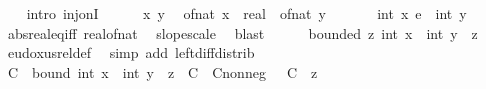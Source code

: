 \begin{isabellebody}
\ \ \isamarkupfalse%
\ {\isacharparenleft}{\kern0pt}intro\ inj{\isacharunderscore}{\kern0pt}onI{\isacharparenright}{\kern0pt}\isanewline
\ \ \ \ \isamarkupfalse%
\ x\ y\ \isamarkupfalse%
\ {\isachardoublequoteopen}{\isacharparenleft}{\kern0pt}of{\isacharunderscore}{\kern0pt}nat\ x\ {\isacharcolon}{\kern0pt}{\isacharcolon}{\kern0pt}\ real{\isacharparenright}{\kern0pt}\ {\isacharequal}{\kern0pt}\ of{\isacharunderscore}{\kern0pt}nat\ y{\isachardoublequoteclose}\isanewline
\ \ \ \ \isamarkupfalse%
\ {\isachardoublequoteopen}{\isacharparenleft}{\kern0pt}{\isacharparenleft}{\kern0pt}{\isacharasterisk}{\kern0pt}{\isacharparenright}{\kern0pt}\ {\isacharparenleft}{\kern0pt}int\ x{\isacharparenright}{\kern0pt}{\isacharparenright}{\kern0pt}\ {\isasymsim}\isactrlsub e\ {\isacharparenleft}{\kern0pt}{\isacharparenleft}{\kern0pt}{\isacharasterisk}{\kern0pt}{\isacharparenright}{\kern0pt}\ {\isacharparenleft}{\kern0pt}int\ y{\isacharparenright}{\kern0pt}{\isacharparenright}{\kern0pt}{\isachardoublequoteclose}\ \isamarkupfalse%
\ abs{\isacharunderscore}{\kern0pt}real{\isacharunderscore}{\kern0pt}eq{\isacharunderscore}{\kern0pt}iff\ real{\isacharunderscore}{\kern0pt}of{\isacharunderscore}{\kern0pt}nat\ \isamarkupfalse%
\ slope{\isacharunderscore}{\kern0pt}scale\ \isamarkupfalse%
\ blast\isanewline
\ \ \ \ \isamarkupfalse%
\ {\isachardoublequoteopen}bounded\ {\isacharparenleft}{\kern0pt}{\isasymlambda}z{\isachardot}{\kern0pt}\ {\isacharparenleft}{\kern0pt}int\ x\ {\isacharminus}{\kern0pt}\ int\ y{\isacharparenright}{\kern0pt}\ {\isacharasterisk}{\kern0pt}\ z{\isacharparenright}{\kern0pt}{\isachardoublequoteclose}\ \isamarkupfalse%
\ eudoxus{\isacharunderscore}{\kern0pt}rel{\isacharunderscore}{\kern0pt}def\ \isamarkupfalse%
\ {\isacharparenleft}{\kern0pt}simp\ add{\isacharcolon}{\kern0pt}\ left{\isacharunderscore}{\kern0pt}diff{\isacharunderscore}{\kern0pt}distrib{\isacharparenright}{\kern0pt}\isanewline
\ \ \ \ \isamarkupfalse%
\ \isamarkupfalse%
\ C\ \ bound{\isacharcolon}{\kern0pt}\ {\isachardoublequoteopen}{\isasymbar}{\isacharparenleft}{\kern0pt}int\ x\ {\isacharminus}{\kern0pt}\ int\ y{\isacharparenright}{\kern0pt}\ {\isacharasterisk}{\kern0pt}\ z{\isasymbar}\ {\isasymle}\ C{\isachardoublequoteclose}\ \ C{\isacharunderscore}{\kern0pt}nonneg{\isacharcolon}{\kern0pt}\ {\isachardoublequoteopen}{}\ {\isasymle}\ C{\isachardoublequoteclose}\ \ z\ \isamarkupfalse%

\end{isabellebody}
